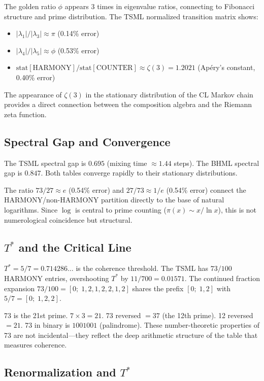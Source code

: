 \documentclass[11pt]{article}
\theoremstyle{remark}
\begin{document}
The golden ratio $\phi$ appears 3 times in eigenvalue ratios, connecting to Fibonacci
structure and prime distribution.  The TSML normalized transition matrix shows:
\begin{itemize}
  \item $|\lambda_1|/|\lambda_3| \approx \pi$ \quad (0.14\% error)
  \item $|\lambda_4|/|\lambda_5| \approx \phi$ \quad (0.53\% error)
  \item $\text{stat}[\text{HARMONY}]/\text{stat}[\text{COUNTER}] \approx \zeta(3) = 1.2021$
    \quad (Ap\'ery's constant, 0.40\% error)
\end{itemize}

The appearance of $\zeta(3)$ in the stationary distribution of the CL Markov chain
provides a direct connection between the composition algebra and the Riemann zeta
function.

\subsection{Spectral Gap and Convergence}

The TSML spectral gap is $0.695$ (mixing time $\approx 1.44$ steps).  The BHML spectral
gap is $0.847$.  Both tables converge rapidly to their stationary distributions.

The ratio $73/27 \approx e$ (0.54\% error) and $27/73 \approx 1/e$ (0.54\% error)
connect the HARMONY/non-HARMONY partition directly to the base of natural logarithms.
Since $\log$ is central to prime counting ($\pi(x) \sim x/\ln x$), this is not
numerological coincidence but structural.

\subsection{$T^*$ and the Critical Line}

$T^* = 5/7 = 0.714286\ldots$ is the coherence threshold.  The TSML has $73/100$
HARMONY entries, overshooting $T^*$ by $11/700 = 0.01571$.  The continued fraction
expansion $73/100 = [0;\; 1, 2, 1, 2, 2, 1, 2]$ shares the prefix $[0;\; 1, 2]$ with
$5/7 = [0;\; 1, 2, 2]$.

73 is the 21st prime.  $7 \times 3 = 21$.  73 reversed $= 37$ (the 12th prime).
12 reversed $= 21$.  73 in binary is $1001001$ (palindrome).  These number-theoretic
properties of 73 are not incidental---they reflect the deep arithmetic structure of the
table that measures coherence.

\subsection{Renormalization and $T^*$}
\end{document}
